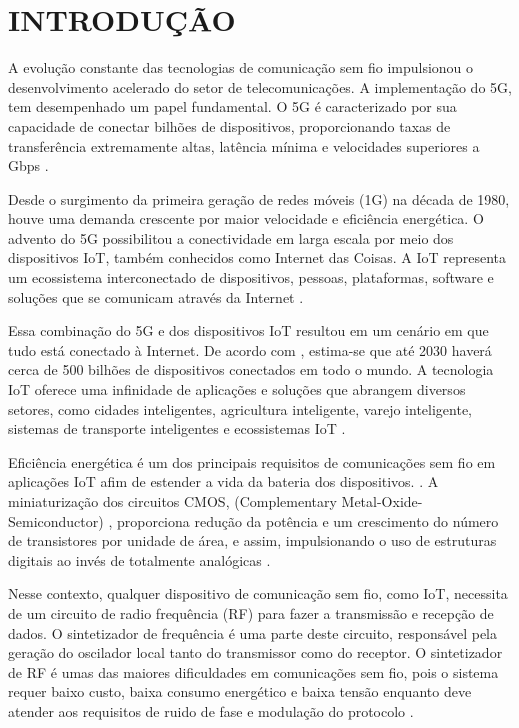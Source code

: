\chapter{INTRODUÇÃO}\label{cap:introducao}
A evolução constante das tecnologias de comunicação sem fio impulsionou o desenvolvimento acelerado do setor de telecomunicações. A implementação do 5G, tem desempenhado um papel fundamental. O 5G é caracterizado por sua capacidade de conectar bilhões de dispositivos, proporcionando taxas de transferência extremamente altas, latência mínima e velocidades superiores a Gbps \cite{khanh2022wireless}.

Desde o surgimento da primeira geração de redes móveis (1G) na década de 1980, houve uma demanda crescente por maior velocidade e eficiência energética. O advento do 5G possibilitou a conectividade em larga escala por meio dos dispositivos IoT, também conhecidos como Internet das Coisas. A IoT representa um ecossistema interconectado de dispositivos, pessoas, plataformas, software e soluções que se comunicam através da Internet \cite{sinche2019survey}.

Essa combinação do 5G e dos dispositivos IoT resultou em um cenário em que tudo está conectado à Internet. De acordo com \cite{Cisco2020}, estima-se que até 2030 haverá cerca de 500 bilhões de dispositivos conectados em todo o mundo. A tecnologia IoT oferece uma infinidade de aplicações e soluções que abrangem diversos setores, como cidades inteligentes, agricultura inteligente, varejo inteligente, sistemas de transporte inteligentes e ecossistemas IoT \cite{khanh2022wireless}.

Eficiência energética é um dos principais requisitos de comunicações sem fio em aplicações IoT afim de estender a vida da bateria dos dispositivos. \cite{souza_2020_systemlevel}. A miniaturização dos circuitos CMOS, (Complementary Metal-Oxide-Semiconductor) \cite{khan2021nanoscale}, proporciona redução da potência e um crescimento do número de transistores por unidade de área, e assim, impulsionando o uso de estruturas digitais ao invés de totalmente analógicas \cite{ferreira2020review}. 

Nesse contexto, qualquer dispositivo de comunicação sem fio, como IoT, necessita de um circuito de radio frequência (RF) para fazer a transmissão e recepção de dados. O sintetizador de frequência é uma parte deste circuito, responsável pela geração do oscilador local tanto do transmissor como do receptor. O sintetizador de RF é umas das maiores dificuldades em comunicações sem fio, pois o sistema requer baixo custo, baixa consumo energético e baixa tensão enquanto deve atender aos requisitos de ruido de fase e modulação do protocolo \cite{staszewski2006all}.

